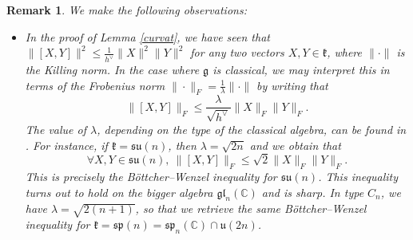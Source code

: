 \documentclass[11pt,twoside]{amsart}
\theoremstyle{plain}
\newtheorem{rem}[prop]{Remark}
\newcommand{\C}{{\mathbb C}}
\begin{document}
\begin{rem}\label{BWAC}
We make the following observations:
\begin{itemize}
\item In the proof of Lemma \ref{curvat}, we have seen that $\|[X,Y]\|^2\le\tfrac{1}{h^\vee}\|X\|^2\|Y\|^2$ for any two vectors $X,Y\in\mathfrak{k}$, where $\|\cdot\|$ is the Killing norm. In the case where $\mathfrak{g}$ is classical, we may interpret this in terms of the Frobenius norm $\|\cdot\|_F=\tfrac{1}{\lambda}\|\cdot\|$ by writing that 
\[\|[X,Y]\|_F\le\frac{\lambda}{\sqrt{h^\vee}}\|X\|_F\|Y\|_F.\]
The value of $\lambda$, depending on the type of the classical algebra, can be found in \cite[\S 12.6]{erdmann-wildon}. For instance, if $\mathfrak{k}=\mathfrak{su}(n)$, then $\lambda=\sqrt{2n}$ and we obtain that
\[\forall X,Y\in\mathfrak{su}(n),~\|[X,Y]\|_F\le\sqrt{2}\|X\|_F\|Y\|_F.\]
This is precisely the B\"{o}ttcher--Wenzel inequality \cite[Theorem 2.2]{bottcher-wenzel} for $\mathfrak{su}(n)$. This inequality turns out to hold on the bigger algebra $\mathfrak{gl}_n(\C)$ and is sharp. In type $C_n$, we have $\lambda=\sqrt{2(n+1)}$, so that we retrieve the same B\"{o}ttcher--Wenzel inequality for $\mathfrak{k}=\mathfrak{sp}(n)=\mathfrak{sp}_{n}(\C)\cap \mathfrak{u}(2n)$.


\end{itemize}
\end{rem}
\end{document}
